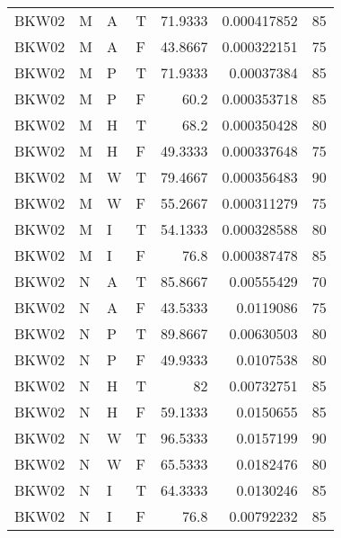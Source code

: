 \begin{tabular}{llllrrr}
    BKW02    & M     & A     & T          & 71.9333    & 0.000417852 & 85       \\
    BKW02    & M     & A     & F          & 43.8667    & 0.000322151 & 75       \\
    BKW02    & M     & P     & T          & 71.9333    & 0.00037384  & 85       \\
    BKW02    & M     & P     & F          & 60.2       & 0.000353718 & 85       \\
    BKW02    & M     & H     & T          & 68.2       & 0.000350428 & 80       \\
    BKW02    & M     & H     & F          & 49.3333    & 0.000337648 & 75       \\
    BKW02    & M     & W     & T          & 79.4667    & 0.000356483 & 90       \\
    BKW02    & M     & W     & F          & 55.2667    & 0.000311279 & 75       \\
    BKW02    & M     & I     & T          & 54.1333    & 0.000328588 & 80       \\
    BKW02    & M     & I     & F          & 76.8       & 0.000387478 & 85       \\
    BKW02    & N     & A     & T          & 85.8667    & 0.00555429  & 70       \\
    BKW02    & N     & A     & F          & 43.5333    & 0.0119086   & 75       \\
    BKW02    & N     & P     & T          & 89.8667    & 0.00630503  & 80       \\
    BKW02    & N     & P     & F          & 49.9333    & 0.0107538   & 80       \\
    BKW02    & N     & H     & T          & 82         & 0.00732751  & 85       \\
    BKW02    & N     & H     & F          & 59.1333    & 0.0150655   & 85       \\
    BKW02    & N     & W     & T          & 96.5333    & 0.0157199   & 90       \\
    BKW02    & N     & W     & F          & 65.5333    & 0.0182476   & 80       \\
    BKW02    & N     & I     & T          & 64.3333    & 0.0130246   & 85       \\
    BKW02    & N     & I     & F          & 76.8       & 0.00792232  & 85       \\
    \hline
\end{tabular}
